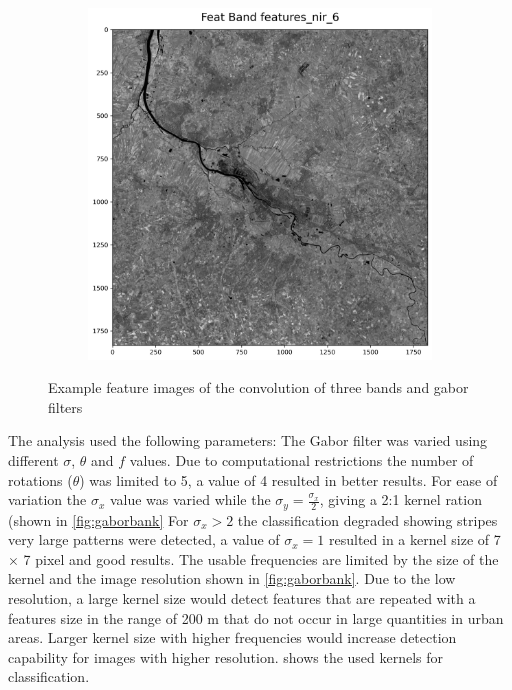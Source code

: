 \documentclass[12pt,a4paper, english,twoside]{scrartcl}
\begin{document}
\begin{figure}[!htbp]
\begin{subfigure}[b]{0.3\textwidth}
      \end{subfigure}
      \begin{subfigure}[b]{0.3\textwidth}
        \includegraphics[width=\textwidth]{img/Features_nir_6.png}
      \end{subfigure}
     \caption{Example feature images of the convolution of three bands and gabor filters\label{fig:gaborresults}}
    \end{figure}    
    \noindent
      The analysis used the following parameters: 
      The Gabor filter was varied using different $\sigma$, $\theta$ and $f$ values.
      Due to computational restrictions the number of rotations ($\theta$) was limited to 5, a value of 4 resulted in better results. 
      For ease of variation the $\sigma_x$ value was varied while the $\sigma_y = \frac{\sigma_x}{2}$, giving a 2:1 kernel ration (shown in \cref{fig:gaborbank} 
      For $\sigma_x > 2$ the classification degraded showing stripes very large patterns were detected, a value of $\sigma_x = 1$ resulted in a kernel size of 7 $\times$ 7 pixel and good results.
%
      The usable frequencies are limited by the size of the kernel and the image resolution shown in \cref{fig:gaborbank}.
      Due to the low resolution, a large kernel size would detect features that are repeated with a features size in the range of 200 m that do not occur in large quantities in urban areas. 
      Larger kernel size with higher frequencies would increase detection capability for images with higher resolution. 
     shows the used kernels for classification.
\end{document}
